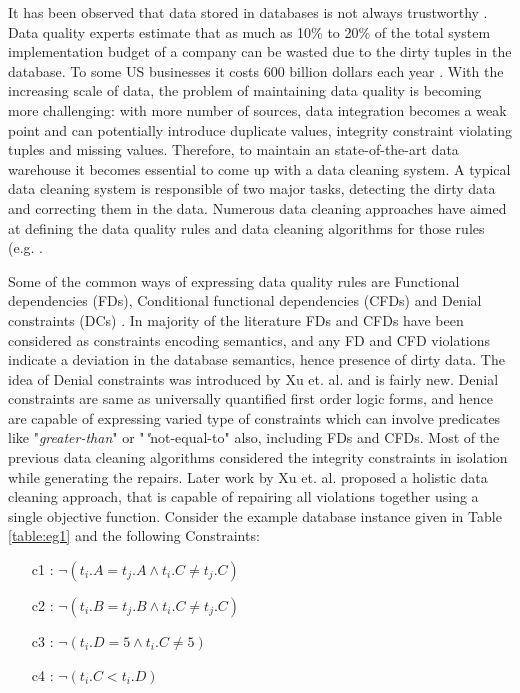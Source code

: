 It has been observed that data stored in databases is not always trustworthy \cite{Redman}.
Data quality experts estimate that as much as 10\% to 20\% of the total system implementation budget of a company can be wasted due to the dirty tuples in the database.
To some US businesses it costs 600 billion dollars each year \cite{TDWI02}.
With the increasing scale of data, the problem of maintaining data quality is becoming more challenging: 
with more number of sources, data integration becomes a weak point and can potentially introduce duplicate values, integrity constraint violating tuples and missing values.
Therefore, to maintain an state-of-the-art data warehouse it becomes essential to come up with a data cleaning system.
A typical data cleaning system is responsible of two major tasks, detecting the dirty data and correcting them in the data.
Numerous data cleaning approaches have aimed at defining the data quality rules and data cleaning algorithms for those rules (e.g. \cite{Cong,Fan,Kolahi,XuChu}.

Some of the common ways of expressing data quality rules are Functional dependencies (FDs), Conditional functional dependencies (CFDs) and Denial constraints (DCs) \cite{XuChu}.
In majority of the literature FDs and CFDs have been considered as constraints encoding semantics, and any FD and CFD violations indicate a deviation in the database semantics, hence presence of dirty data.
The idea of Denial constraints was introduced by Xu et. al. \cite{XuChuDC} and is fairly new.
Denial constraints are same as universally quantified first order logic forms, and hence are capable of expressing varied type of constraints which can involve predicates
like "\textit{greater-than}" or "\textit"{not-equal-to}" also, including FDs and CFDs.
Most of the previous data cleaning algorithms \cite{Cong,Fan,Kolahi} considered the integrity constraints in isolation while generating the repairs.
Later work by Xu et. al.\cite{XuChu} proposed a holistic data cleaning approach, that is capable of repairing all violations together using a single objective function.
Consider the example database instance given in Table \ref{table:eg1} and the following Constraints:

\begin{enumerate}
\item[c1] : $ \neg(t_i.A = t_j.A \wedge t_i.C \neq t_j.C)$
\item[c2] : $ \neg(t_i.B = t_j.B \wedge t_i.C \neq t_j.C)$
\item[c3] : $ \neg(t_i.D = 5 \wedge t_i.C \neq 5)$
\item[c4] : $ \neg(t_i.C < t_i.D )$
\end{enumerate}

